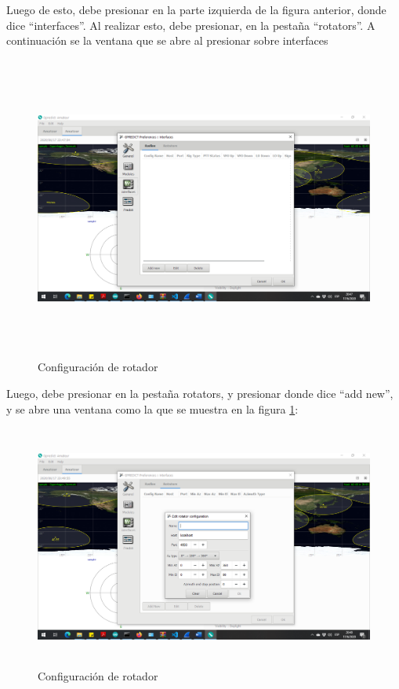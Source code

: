 Luego de esto, debe presionar en la parte izquierda de la figura anterior, donde dice ``interfaces''. Al realizar esto, debe presionar, en la pestaña ``rotators''. A continuación se la ventana que se abre al presionar sobre interfaces
\begin{figure}[H]
	\includegraphics[height=10cm,width=\textwidth]{rotators_int}
	\caption{Configuración de rotador}
\end{figure} 

Luego, debe presionar en la pestaña rotators, y presionar donde dice ``add new'', y se abre una ventana como la que se muestra en la figura \ref{fig:conf_rot_ip}: 

\begin{figure}[h]
	\includegraphics[height=8cm]{conf_rot}
	\caption{Configuración de rotador}
	\label{fig:conf_rot_ip}
\end{figure} 

